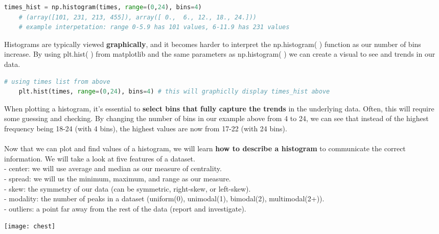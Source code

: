 \documentclass[11pt, a4paper]{article}
\begin{document}
\begin{spacing}{1.1}
\begin{lstlisting}[language=Python]
	times_hist = np.histogram(times, range=(0,24), bins=4)
	# (array([101, 231, 213, 455]), array([ 0.,  6., 12., 18., 24.])) 
	# example interpetation: range 0-5.9 has 101 values, 6-11.9 has 231 values \end{lstlisting} \newpage
	\noindent Histograms are typically viewed \textbf{graphically}, and it becomes harder to interpret the np.histogram( ) function as our number of bins increase. By using plt.hist( ) from matplotlib and the same parameters as np.histogram( ) we can create a visual to see and trends in our data. 
	\begin{lstlisting}[language=Python]
	# using times list from above
	plt.hist(times, range=(0,24), bins=4) # this will graphiclly display times_hist above\end{lstlisting}\vspace*{1mm}
	When plotting a histogram, it’s essential to \textbf{select bins that fully capture the trends} in the underlying data. Often, this will require some guessing and checking. By changing the number of bins in our example above from 4 to 24, we can see that instead of the highest frequency being 18-24 (with 4 bins), the highest values are now from 17-22 (with 24 bins). \\~\\
	Now that we can plot and find values of a histogram, we will learn \textbf{how to describe a histogram} to communicate the correct information. We will take a look at five features of a dataset. \\
	\hspace*{3mm} - center: we will use average and median as our measure of centrality. \\
	\hspace*{3mm} - spread: we will us the minimum, maximum, and range as our measure. \\
	\hspace*{3mm} - skew: the symmetry of our data (can be symmetric, right-skew, or left-skew). \\
	\hspace*{3mm} - modality: the number of peaks in a dataset (uniform(0), unimodal(1), bimodal(2), multimodal(2+)). \\
	\hspace*{3mm} - outliers: a point far away from the rest of the data (report and investigate). \vspace*{1mm} \\
	\begin{minipage}[c]{8cm}
		\texttt{[image: chest]}

\end{minipage}
\end{spacing}
\end{document}
